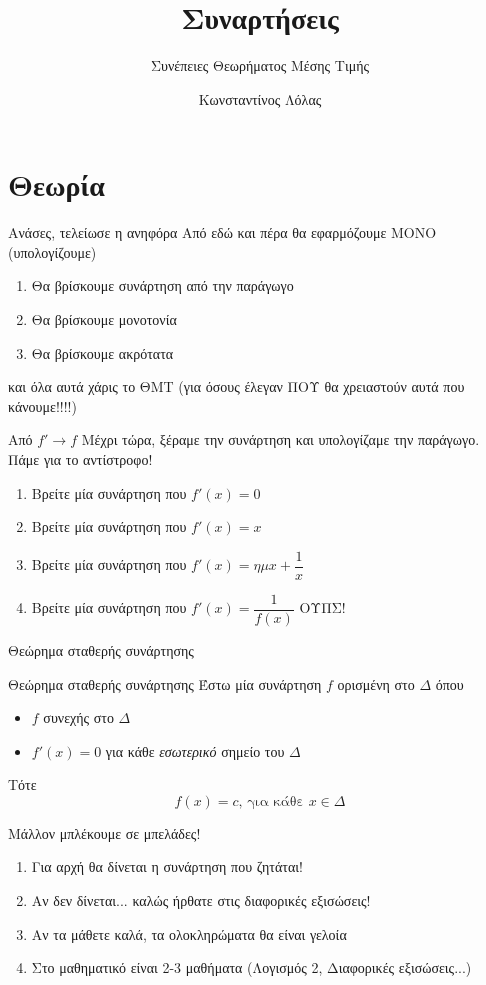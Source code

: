 \documentclass{presentation}
\title{Συναρτήσεις}
\subtitle{Συνέπειες Θεωρήματος Μέσης Τιμής}
\author[Λόλας]{Κωνσταντίνος Λόλας}
\begin{document}
\begin{frame}
  \titlepage
\end{frame}

\section{Θεωρία}
\begin{frame}{Ανάσες, τελείωσε η ανηφόρα}
  Από εδώ και πέρα θα εφαρμόζουμε ΜΟΝΟ (υπολογίζουμε)
  \begin{enumerate}
    \item<1-> Θα βρίσκουμε συνάρτηση από την παράγωγο
    \item<2-> Θα βρίσκουμε μονοτονία
    \item<3-> Θα βρίσκουμε ακρότατα
  \end{enumerate}
   και όλα αυτά χάρις το ΘΜΤ (για όσους έλεγαν ΠΟΥ θα χρειαστούν αυτά που κάνουμε!!!!)
\end{frame}

\begin{frame}{Από $f'\to f$}
  Μέχρι τώρα, ξέραμε την συνάρτηση και υπολογίζαμε την παράγωγο. Πάμε για το αντίστροφο!
  \begin{enumerate}
    \item<1-> Βρείτε μία συνάρτηση που $f'(x)=0$
    \item<2-> Βρείτε μία συνάρτηση που $f'(x)=x$
    \item<3-> Βρείτε μία συνάρτηση που $f'(x)=ημx+\dfrac{1}{x}$
    \item<4-> Βρείτε μία συνάρτηση που $f'(x)=\dfrac{1}{f(x)}$ ΟΥΠΣ!
  \end{enumerate}
\end{frame}

\begin{frame}{Θεώρημα σταθερής συνάρτησης}
  \begin{block}{Θεώρημα σταθερής συνάρτησης}
    Έστω μία συνάρτηση $f$ ορισμένη στο $Δ$ όπου
    \begin{itemize}
      \item $f$ συνεχής στο $Δ$
      \item $f'(x)=0$ για κάθε \emph{εσωτερικό} σημείο του $Δ$
    \end{itemize}
    Τότε
    $$f(x)=c \text{, για κάθε } x\in Δ$$
  \end{block}
\end{frame}

\begin{frame}{Μάλλον μπλέκουμε σε μπελάδες!}
  \begin{enumerate}
    \item<1-> Για αρχή θα δίνεται η συνάρτηση που ζητάται!
    \item<2-> Αν δεν δίνεται... καλώς ήρθατε στις διαφορικές εξισώσεις!
    \item<3-> Αν τα μάθετε καλά, τα ολοκληρώματα θα είναι γελοία
    \item<4-> Στο μαθηματικό είναι 2-3 μαθήματα (Λογισμός 2, Διαφορικές εξισώσεις...)
  \end{enumerate}
\end{frame}
\end{document}
